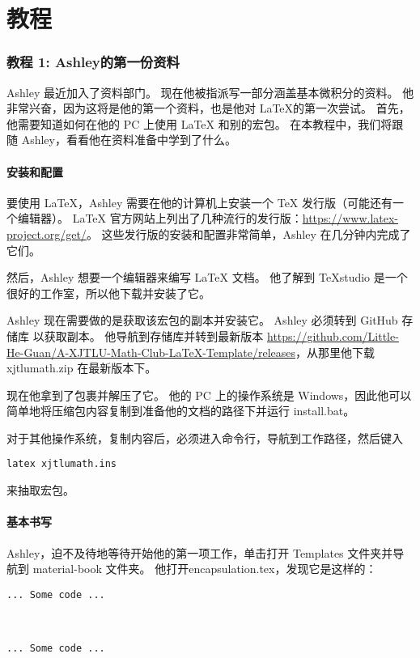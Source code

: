\part{教程}
\section{教程 1: Ashley的第一份资料}
Ashley 最近加入了资料部门。 现在他被指派写一部分涵盖基本微积分的资料。 他非常兴奋，因为这将是他的第一个资料，也是他对 \LaTeX 的第一次尝试。 首先，他需要知道如何在他的 PC 上使用 \LaTeX{} 和别的宏包。 在本教程中，我们将跟随 Ashley，看看他在资料准备中学到了什么。

\subsection{安装和配置}
要使用 \LaTeX{}，Ashley 需要在他的计算机上安装一个 \TeX{} 发行版（可能还有一个编辑器）。 \LaTeX{} 官方网站上列出了几种流行的发行版：\url{https://www.latex-project.org/get/}。 这些发行版的安装和配置非常简单，Ashley 在几分钟内完成了它们。

然后，Ashley 想要一个编辑器来编写 \LaTeX{} 文档。 他了解到 \TeX studio 是一个很好的工作室，所以他下载并安装了它。

Ashley 现在需要做的是获取该宏包的副本并安装它。 Ashley 必须转到 GitHub 存储库 \gitrepo{} 以获取副本。 他导航到存储库并转到最新版本 \url{https://github.com/Little-He-Guan/A-XJTLU-Math-Club-LaTeX-Template/releases}，从那里他下载 xjtlumath.zip 在最新版本下。

现在他拿到了包裹并解压了它。 他的 PC 上的操作系统是 Windows，因此他可以简单地将压缩包内容复制到准备他的文档的路径下并运行 install.bat。

对于其他操作系统，复制内容后，必须进入命令行，导航到工作路径，然后键入
\begin{verbatim}
latex xjtlumath.ins
\end{verbatim}
来抽取宏包。 

\subsection{基本书写}
Ashley，迫不及待地等待开始他的第一项工作，单击打开 Templates 文件夹并导航到 material-book 文件夹。 他打开encapsulation.tex，发现它是这样的：
\begin{lstlisting}
... Some code ...



... Some code ...
\end{lstlisting}


